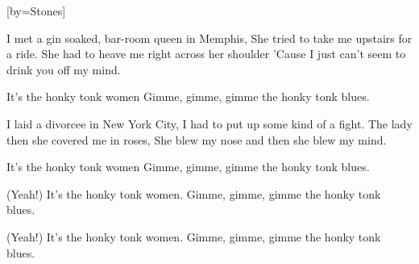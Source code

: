 

[by=Stones]


\beginverse
I met a gin soaked, bar-room queen in Memphis,
She tried to take me upstairs for a ride.
She had to heave me right across her shoulder
'Cause I just can't seem to drink you off my mind.
\endverse

\beginchorus
It's the honky tonk women
Gimme, gimme, gimme the honky tonk blues.
\endchorus

\beginverse
I laid a divorcee in New York City,
I had to put up some kind of a fight.
The lady then she covered me in roses,
She blew my nose and then she blew my mind.
\endverse

\beginchorus
It's the honky tonk women
Gimme, gimme, gimme the honky tonk blues.

(Yeah!) It's the honky tonk women.
Gimme, gimme, gimme the honky tonk blues.

(Yeah!) It's the honky tonk women.
Gimme, gimme, gimme the honky tonk blues.
\endchorus



\chordson
\endsong
